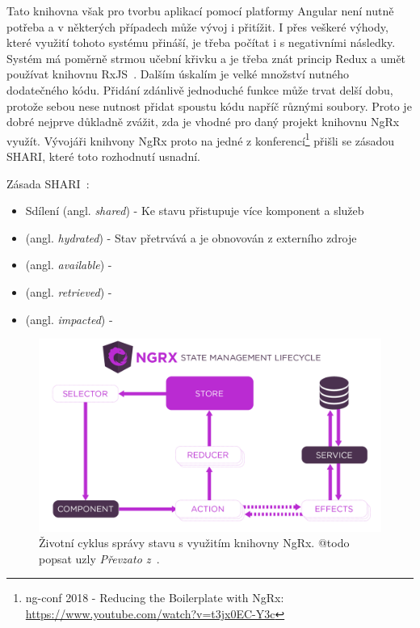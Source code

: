 Tato knihovna však pro tvorbu aplikací pomocí platformy Angular není nutně potřeba a v některých případech může vývoj i přitížit. I přes veškeré výhody, které využití tohoto systému přináší, je třeba počítat i s negativními následky. Systém má poměrně strmou učební křivku a je třeba znát princip Redux a umět používat knihovnu RxJS~\cite{bib:ngrx-docs}.
Dalším úskalím je velké množství nutného dodatečného kódu. Přidání zdánlivě jednoduché funkce může trvat delší dobu, protože sebou nese nutnost přidat spoustu kódu napříč různými soubory. Proto je dobré nejprve důkladně zvážit, zda je vhodné pro daný projekt knihovnu NgRx využít. Vývojáři knihvony NgRx proto na jedné z konferencí\footnote {ng-conf 2018 - Reducing the Boilerplate with NgRx: \url{https://www.youtube.com/watch?v=t3jx0EC-Y3c}} přišli se zásadou SHARI, které toto rozhodnutí usnadní. 

Zásada SHARI~\cite{biib:ng-conf}:
\begin{itemize}
  \item Sdílení (angl. \emph{shared}) - Ke stavu přistupuje více komponent a služeb
  \item (angl. \emph{hydrated}) - Stav přetrvává a je obnovován z externího zdroje
  \item (angl. \emph{available}) - 
  \item (angl. \emph{retrieved}) - 
  \item (angl. \emph{impacted}) - 
\end{itemize}

\blindtext
\begin{figure}[H]
	\centering
	\includegraphics[width=\textwidth]{obrazky-figures/ngrx-lifecycle.png}
	\caption{Životní cyklus správy stavu s využitím knihovny NgRx. @todo popsat uzly \emph{Převzato z~\cite{bib:ngrx-lifecycle}}.}
\end{figure}
\blindtext

